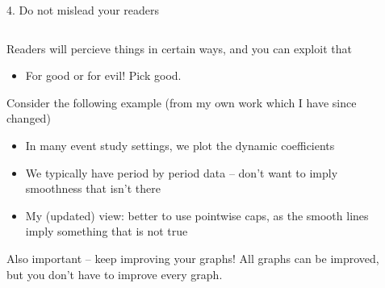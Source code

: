 \documentclass[notes,11pt, aspectratio=169]{beamer}
\newenvironment{wideitemize}{\itemize\addtolength{\itemsep}{10pt}}{\enditemize}
\begin{document}
\begin{frame}{4. Do not mislead your readers}
  \begin{columns}[T] %
    \begin{column}{.7\textwidth}
      \begin{wideitemize}
      \item Readers will percieve things in certain ways, and you can exploit that
        \begin{itemize}
        \item For good or for evil! Pick good.
        \end{itemize}
      \item Consider the following example (from my own work which I have since changed)
        \begin{itemize}
        \item In many event study settings, we plot the dynamic coefficients
        \item We typically have period by period data -- don't want to
          imply smoothness that isn't there
        \item My (updated) view: better to use pointwise caps, as the
          smooth lines imply something that is not true
        \end{itemize}
      \item Also important -- keep improving your graphs! All graphs
        can be improved, but you don't have to improve every graph.
      \end{wideitemize}
  \end{column}%
  \hfill%
  \begin{column}{.4\textwidth}
\end{column}
\end{columns}
\end{frame}
\end{document}
